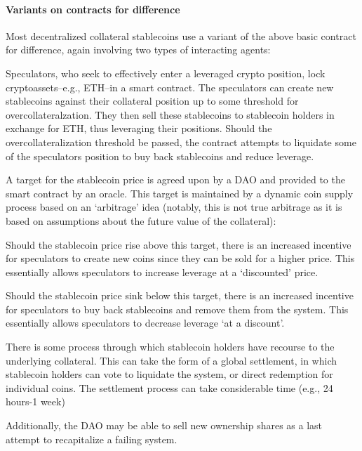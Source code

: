 \documentclass[10pt]{article}
\begin{document}
\paragraph{Variants on contracts for difference} Most decentralized collateral stablecoins use a variant of the above basic contract for difference, again involving two types of interacting agents:
\begin{compactitem}
	\item Speculators, who seek to effectively enter a leveraged crypto position, lock cryptoassets--e.g., ETH--in a smart contract. The speculators can create new stablecoins against their collateral position up to some threshold for overcollateralzation. They then sell these stablecoins to stablecoin holders in exchange for ETH, thus leveraging their positions. Should the overcollateralization threshold be passed, the contract attempts to liquidate some of the speculators position to buy back stablecoins and reduce leverage.
	
	\item A target for the stablecoin price is agreed upon by a DAO and provided to the smart contract by an oracle. This target is maintained by a dynamic coin supply process based on an `arbitrage' idea (notably, this is not true arbitrage as it is based on assumptions about the future value of the collateral):
	\begin{compactitem}
		\item Should the stablecoin price rise above this target, there is an increased incentive for speculators to create new coins since they can be sold for a higher price. This essentially allows speculators to increase leverage at a `discounted' price.
		\item Should the stablecoin price sink below this target, there is an increased incentive for speculators to buy back stablecoins and remove them from the system. This essentially allows speculators to decrease leverage `at a discount'.
	\end{compactitem}
	
	\item There is some process through which stablecoin holders have recourse to the underlying collateral. This can take the form of a global settlement, in which stablecoin holders can vote to liquidate the system, or direct redemption for individual coins. The settlement process can take considerable time (e.g., 24 hours-1 week)
	\item Additionally, the DAO may be able to sell new ownership shares as a last attempt to recapitalize a failing system.
\end{compactitem}
\end{document}
